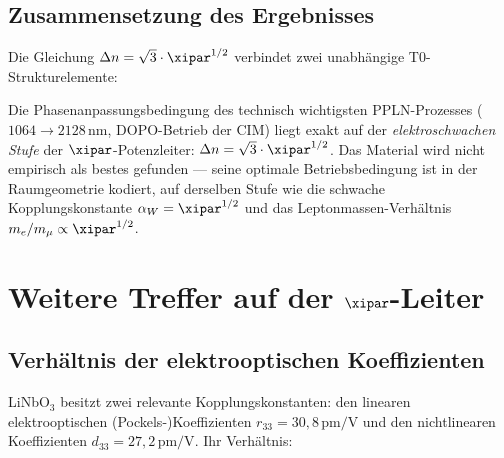 \subsection{Zusammensetzung des Ergebnisses}

Die Gleichung $\Delta n = \sqrt{3}\cdot\xipar^{1/2}$ verbindet zwei
unabhängige T0-Strukturelemente:

\begin{center}
\renewcommand{\arraystretch}{1.5}
\end{center}

\begin{important}
Die Phasenanpassungsbedingung des technisch wichtigsten PPLN-Prozesses
($1064 \to 2128\,\text{nm}$, DOPO-Betrieb der CIM) liegt exakt auf der
\emph{elektroschwachen Stufe} der $\xipar$-Potenzleiter:
$\Delta n = \sqrt{3}\cdot\xipar^{1/2}$. Das Material wird nicht empirisch
als bestes gefunden — seine optimale Betriebsbedingung ist in der
Raumgeometrie kodiert, auf derselben Stufe wie die schwache
Kopplungskonstante $\alpha_W = \xipar^{1/2}$ und das Leptonmassen-Verhältnis
$m_e/m_\mu \propto \xipar^{1/2}$.
\end{important}

\clearpage

\section{Weitere Treffer auf der \texorpdfstring{$\xipar$}{xi}-Leiter}
\label{sec:weitere}

\subsection{Verhältnis der elektrooptischen Koeffizienten}

LiNbO$_3$ besitzt zwei relevante Kopplungskonstanten: den linearen
elektrooptischen (Pockels-)Koeffizienten $r_{33} = 30{,}8\,\text{pm/V}$
und den nichtlinearen Koeffizienten $d_{33} = 27{,}2\,\text{pm/V}$.
Ihr Verhältnis:

